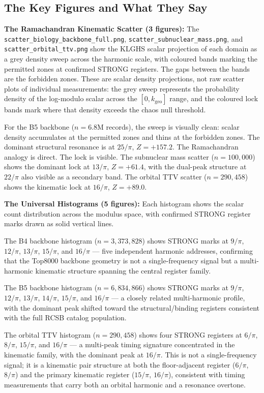 \documentclass[11pt, letterpaper, openany]{book}
\begin{document}
\begin{empiricalbox}
\section{The Key Figures and What They Say}

\textbf{The Ramachandran Kinematic Scatter (3 figures):}
The \texttt{scatter\_biology\_backbone\_full.png},
\texttt{scatter\_subnuclear\_mass.png}, and \texttt{scatter\_orbital\_ttv.png}
show the KLGHS scalar projection of each domain as a grey density sweep across
the harmonic scale, with coloured bands marking the permitted zones at confirmed
STRONG registers. The gaps between the bands are the forbidden zones. These are
scalar density projections, not raw scatter plots of individual measurements:
the grey sweep represents the probability density of the log-modulo scalar
across the $[0, k_\text{geo}]$ range, and the coloured lock bands mark where
that density exceeds the chaos null threshold.

For the B5 backbone ($n=6.8$M records), the sweep is visually clean: scalar
density accumulates at the permitted zones and thins at the forbidden zones.
The dominant structural resonance is at $25/\pi$, $Z = +157.2$. The
Ramachandran analogy is direct. The lock is visible. The subnuclear mass
scatter ($n=100{,}000$) shows the dominant lock at $13/\pi$, $Z = +61.4$,
with the dual-peak structure at $22/\pi$ also visible as a secondary band.
The orbital TTV scatter ($n=290{,}458$) shows the kinematic lock at
$16/\pi$, $Z = +89.0$.

\textbf{The Universal Histograms (5 figures):}
Each histogram shows the scalar count distribution across the modulus space,
with confirmed STRONG register marks drawn as solid vertical lines.

The B4 backbone histogram ($n=3{,}373{,}828$) shows STRONG marks at
$9/\pi$, $12/\pi$, $13/\pi$, $15/\pi$, and $16/\pi$ --- five independent
harmonic addresses, confirming that the Top8000 backbone geometry is not a
single-frequency signal but a multi-harmonic kinematic structure spanning
the central register family.

The B5 backbone histogram ($n=6{,}834{,}866$) shows STRONG marks at
$9/\pi$, $12/\pi$, $13/\pi$, $14/\pi$, $15/\pi$, and $16/\pi$ --- a
closely related multi-harmonic profile, with the dominant peak shifted
toward the structural/binding registers consistent with the full RCSB
catalog population.

The orbital TTV histogram ($n=290{,}458$) shows four STRONG registers at
$6/\pi$, $8/\pi$, $15/\pi$, and $16/\pi$ --- a multi-peak timing signature
concentrated in the kinematic family, with the dominant peak at $16/\pi$.
This is not a single-frequency signal; it is a kinematic pair structure
at both the floor-adjacent register ($6/\pi$, $8/\pi$) and the primary
kinematic register ($15/\pi$, $16/\pi$), consistent with timing measurements
that carry both an orbital harmonic and a resonance overtone.


\end{empiricalbox}
\end{document}
